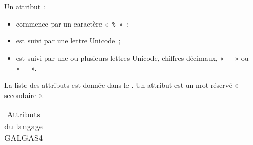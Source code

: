
Un attribut~:
\begin{itemize}
  \item commence par un caractère «~\texttt{\%}~»~;
  \item est suivi par une lettre Unicode~;
  \item est suivi par une ou plusieurs lettres Unicode, chiffres décimaux, «~\texttt{-}~» ou «~\texttt{\_}~».
\end{itemize}

La liste des attributs est donnée dans le . Un attribut est un mot réservé « secondaire ».

\begin{table}[ht]
  \centering
  \begin{tabular}{llllllll}
    
  \end{tabular}
  \caption{Attributs du langage GALGAS4}
\end{table}



